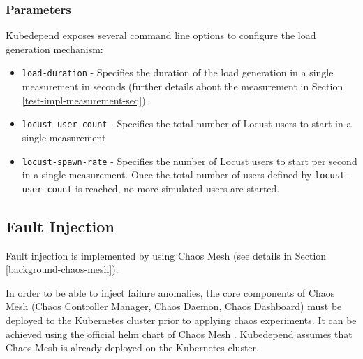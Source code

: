 
\subsubsection{Parameters}

Kubedepend exposes several command line options to configure the load generation mechanism:

\begin{itemize}
	\item \texttt{load-duration} - Specifies the duration of the load generation in a single measurement in seconds (further details about the measurement in Section \ref{test-impl-measurement-seq}). 
	\item \texttt{locust-user-count} - Specifies the total number of Locust users to start in a single measurement
	\item \texttt{locust-spawn-rate} - Specifies the number of Locust users to start per second in a single measurement. Once the total number of users defined by \texttt{locust-user-count} is reached, no more simulated users are started. 
\end{itemize}


\subsection{Fault Injection}


Fault injection is implemented by using Chaos Mesh (see details in Section \ref{background-chaos-mesh}).

In order to be able to inject failure anomalies, the core components of Chaos Mesh (Chaos Controller Manager, Chaos Daemon, Chaos Dashboard) must be deployed to the Kubernetes cluster prior to applying chaos experiments. It can be achieved using the official helm chart of Chaos Mesh \cite{ChaosMeshChart}. Kubedepend assumes that Chaos Mesh is already deployed on the Kubernetes cluster.

